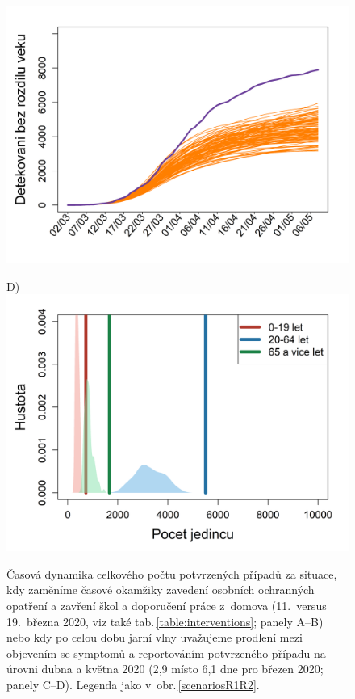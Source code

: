 \begin{figure}
\begin{center}
\begin{minipage}[m]{0.45\textwidth}
			\includegraphics[width = \textwidth]{pic/sc_testing.png}
		\end{minipage}
		\begin{minipage}[m]{0.45\textwidth}
			D) \\
			\includegraphics[width = \textwidth]{pic/sc_testing_PDF.png}
		\end{minipage}
	\end{center}
	\caption{Časová dynamika celkového počtu potvrzených případů za situace, kdy zaměníme časové okamžiky zavedení osobních ochranných opatření a zavření škol a doporučení práce z~domova  (11.\ versus 19.\ března 2020, viz také tab.\,\ref{table:interventions}; panely A--B) nebo kdy po celou dobu jarní vlny uvažujeme prodlení mezi objevením se symptomů a reportováním potvrzeného případu na úrovni dubna a května 2020 (2,9 místo 6,1 dne pro březen 2020; panely C--D). Legenda jako v~obr.\,\ref{scenariosR1R2}.}
	\label{switch}
\end{figure}

